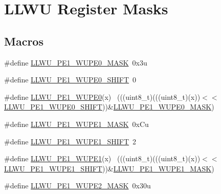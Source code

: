 \hypertarget{group___l_l_w_u___register___masks}{}\section{L\+L\+WU Register Masks}
\label{group___l_l_w_u___register___masks}
\subsection*{Macros}
\begin{DoxyCompactItemize}
\item 
\#define \hyperlink{group___l_l_w_u___register___masks_ga6ed6c56a8797caa64d27eb915c164dad}{L\+L\+W\+U\+\_\+\+P\+E1\+\_\+\+W\+U\+P\+E0\+\_\+\+M\+A\+SK}~0x3u
\item 
\#define \hyperlink{group___l_l_w_u___register___masks_ga234c02ee9c2b3e3e248c90473e922336}{L\+L\+W\+U\+\_\+\+P\+E1\+\_\+\+W\+U\+P\+E0\+\_\+\+S\+H\+I\+FT}~0
\item 
\#define \hyperlink{group___l_l_w_u___register___masks_gad0111a325ce3f549a1726373cde88f96}{L\+L\+W\+U\+\_\+\+P\+E1\+\_\+\+W\+U\+P\+E0}(x)                                            ~(((uint8\+\_\+t)(((uint8\+\_\+t)(x))$<$$<$\hyperlink{group___l_l_w_u___register___masks_ga234c02ee9c2b3e3e248c90473e922336}{L\+L\+W\+U\+\_\+\+P\+E1\+\_\+\+W\+U\+P\+E0\+\_\+\+S\+H\+I\+FT}))\&\hyperlink{group___l_l_w_u___register___masks_ga6ed6c56a8797caa64d27eb915c164dad}{L\+L\+W\+U\+\_\+\+P\+E1\+\_\+\+W\+U\+P\+E0\+\_\+\+M\+A\+SK})
\item 
\#define \hyperlink{group___l_l_w_u___register___masks_gac0c417f78992f2ebaca7267ef06d888a}{L\+L\+W\+U\+\_\+\+P\+E1\+\_\+\+W\+U\+P\+E1\+\_\+\+M\+A\+SK}~0x\+Cu
\item 
\#define \hyperlink{group___l_l_w_u___register___masks_gaa9b8224f389f9c3d4f13772d8e5fbeee}{L\+L\+W\+U\+\_\+\+P\+E1\+\_\+\+W\+U\+P\+E1\+\_\+\+S\+H\+I\+FT}~2
\item 
\#define \hyperlink{group___l_l_w_u___register___masks_ga51ac5ef18e9ddf78bd29e79575408a00}{L\+L\+W\+U\+\_\+\+P\+E1\+\_\+\+W\+U\+P\+E1}(x)                                            ~(((uint8\+\_\+t)(((uint8\+\_\+t)(x))$<$$<$\hyperlink{group___l_l_w_u___register___masks_gaa9b8224f389f9c3d4f13772d8e5fbeee}{L\+L\+W\+U\+\_\+\+P\+E1\+\_\+\+W\+U\+P\+E1\+\_\+\+S\+H\+I\+FT}))\&\hyperlink{group___l_l_w_u___register___masks_gac0c417f78992f2ebaca7267ef06d888a}{L\+L\+W\+U\+\_\+\+P\+E1\+\_\+\+W\+U\+P\+E1\+\_\+\+M\+A\+SK})
\item 
\#define \hyperlink{group___l_l_w_u___register___masks_ga97e8e2fc8ce673f6b4625d307bc94b4a}{L\+L\+W\+U\+\_\+\+P\+E1\+\_\+\+W\+U\+P\+E2\+\_\+\+M\+A\+SK}~0x30u

\end{DoxyCompactItemize}
